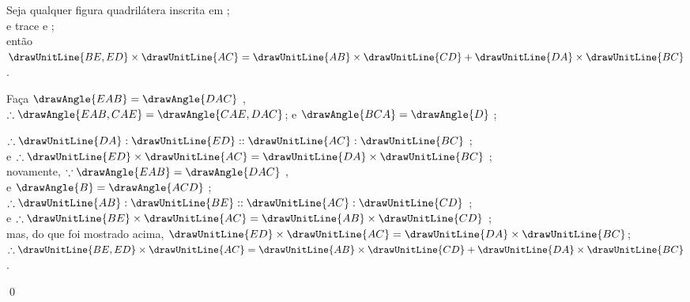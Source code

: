 \documentclass[booklanguage=brazilian]{byrnebook}
\begin{document}
\begin{center}
Seja  qualquer figura quadrilátera inscrita em ;\\
e trace  e ;\\
então $\drawUnitLine{BE,ED} \times \drawUnitLine{AC} = \drawUnitLine{AB} \times \drawUnitLine{CD} + \drawUnitLine{DA} \times \drawUnitLine{BC}$.

Faça $\drawAngle{EAB} = \drawAngle{DAC}$ ,\\
$\therefore \drawAngle{EAB,CAE} = \drawAngle{CAE,DAC}$; e $\drawAngle{BCA} = \drawAngle{D}$ ;

$\therefore \drawUnitLine{DA} : \drawUnitLine{ED} :: \drawUnitLine{AC} : \drawUnitLine{BC}$ ;\\
e $\therefore \drawUnitLine{ED} \times \drawUnitLine{AC} = \drawUnitLine{DA} \times \drawUnitLine{BC}$ ;\\
novamente, $\because \drawAngle{EAB} = \drawAngle{DAC}$ \byref{\constref},\\ %
e $\drawAngle{B} = \drawAngle{ACD}$ ;\\
$\therefore \drawUnitLine{AB} : \drawUnitLine{BE} :: \drawUnitLine{AC} : \drawUnitLine{CD}$ ;\\
e $\therefore \drawUnitLine{BE} \times \drawUnitLine{AC} = \drawUnitLine{AB} \times \drawUnitLine{CD}$ ;\\
mas, do que foi mostrado acima, $\drawUnitLine{ED} \times \drawUnitLine{AC} = \drawUnitLine{DA} \times \drawUnitLine{BC}$;\\
$\therefore \drawUnitLine{BE,ED} \times \drawUnitLine{AC} = \drawUnitLine{AB} \times \drawUnitLine{CD} + \drawUnitLine{DA} \times \drawUnitLine{BC}$ .
\end{center}

\qed

\clearpage
\end{document}
